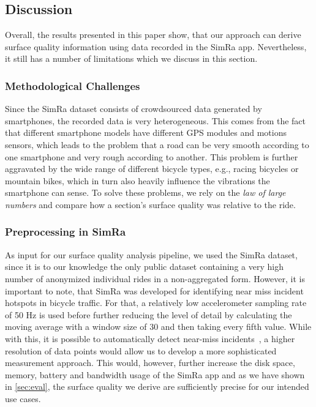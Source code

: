 \subsection{Discussion}
\label{subsec:discussion_cyclequality}
Overall, the results presented in this paper show, that our approach can derive surface quality information using data recorded in the SimRa app.
Nevertheless, it still has a number of limitations which we discuss in this section.

\subsubsection{Methodological Challenges}
\label{subsubsec:methodological_challenges_cyclequality}
Since the SimRa dataset consists of crowdsourced data generated by smartphones, the recorded data is very heterogeneous.
This comes from the fact that different smartphone models have different GPS modules and motions sensors, which leads to the problem that a road can be very smooth according to one smartphone and very rough according to another.
This problem is further aggravated by the wide range of different bicycle types, e.g., racing bicycles or mountain bikes, which in turn also heavily influence the vibrations the smartphone can sense.
To solve these problems, we rely on the \textit{law of large numbers} and compare how a section's surface quality was relative to the ride. 

\subsubsection{Preprocessing in SimRa}
\label{subsubsec:preprocessing_in_simra}
As input for our surface quality analysis pipeline, we used the SimRa dataset, since it is to our knowledge the only public dataset containing a very high number of anonymized individual rides in a non-aggregated form.
However, it is important to note, that SimRa was developed for identifying near miss incident hotspots in bicycle traffic.
For that, a relatively low accelerometer sampling rate of 50 Hz is used before further reducing the level of detail by calculating the moving average with a window size of 30 and then taking every fifth value.
While with this, it is possible to automatically detect near-miss incidents~\cite{karakaya2022cyclesense}, a higher resolution of data points would allow us to develop a more sophisticated measurement approach.
This would, however, further increase the disk space, memory, battery and bandwidth usage of the SimRa app and as we have shown in \cref{sec:eval}, the surface quality we derive are sufficiently precise for our intended use cases.

